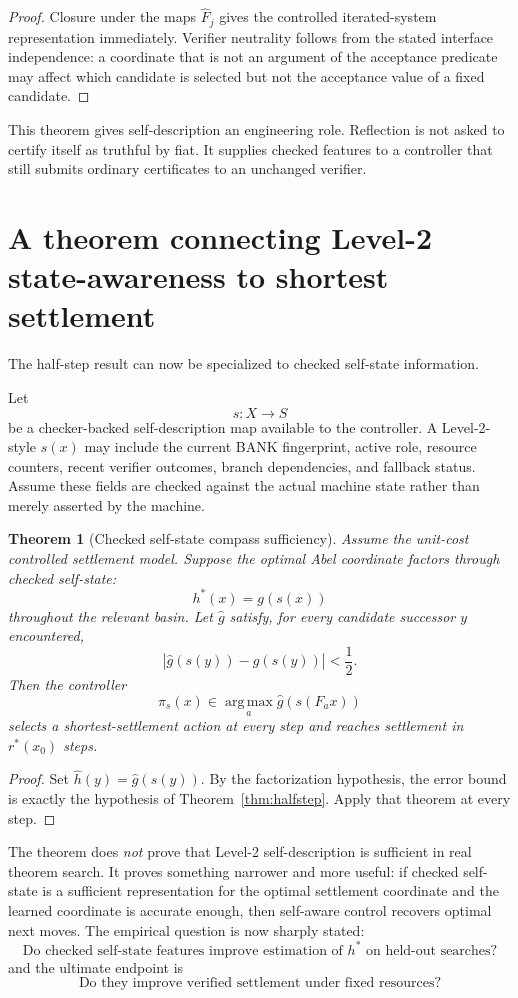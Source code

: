 \documentclass[11pt]{article}
\newtheorem{theorem}{Theorem}[section]
\theoremstyle{definition}
\theoremstyle{remark}
\newcommand{\argmaxop}{\operatorname*{arg\,max}}
\begin{document}
\begin{proof}
Closure under the maps $\widehat F_j$ gives the controlled iterated-system representation immediately. Verifier neutrality follows from the stated interface independence: a coordinate that is not an argument of the acceptance predicate may affect which candidate is selected but not the acceptance value of a fixed candidate.
\end{proof}

This theorem gives self-description an engineering role. Reflection is not asked to certify itself as truthful by fiat. It supplies checked features to a controller that still submits ordinary certificates to an unchanged verifier.

\section{A theorem connecting Level-2 state-awareness to shortest settlement}

The half-step result can now be specialized to checked self-state information.

Let
\[
s:X\to S
\]
be a checker-backed self-description map available to the controller. A Level-2-style $s(x)$ may include the current BANK fingerprint, active role, resource counters, recent verifier outcomes, branch dependencies, and fallback status. Assume these fields are checked against the actual machine state rather than merely asserted by the machine.

\begin{theorem}[Checked self-state compass sufficiency]\label{thm:selfcompass}
Assume the unit-cost controlled settlement model. Suppose the optimal Abel coordinate factors through checked self-state:
\[
h^*(x)=g(s(x))
\]
throughout the relevant basin. Let $\widehat g$ satisfy, for every candidate successor $y$ encountered,
\[
|\widehat g(s(y))-g(s(y))|<\frac12.
\]
Then the controller
\[
\pi_s(x)\in\argmaxop_a \widehat g(s(F_a x))
\]
selects a shortest-settlement action at every step and reaches settlement in $r^*(x_0)$ steps.
\end{theorem}

\begin{proof}
Set $\widehat h(y)=\widehat g(s(y))$. By the factorization hypothesis, the error bound is exactly the hypothesis of Theorem~\ref{thm:halfstep}. Apply that theorem at every step.
\end{proof}

The theorem does \emph{not} prove that Level-2 self-description is sufficient in real theorem search. It proves something narrower and more useful: if checked self-state is a sufficient representation for the optimal settlement coordinate and the learned coordinate is accurate enough, then self-aware control recovers optimal next moves. The empirical question is now sharply stated:
\[
\boxed{\text{Do checked self-state features improve estimation of }h^*\text{ on held-out searches?}}
\]
and the ultimate endpoint is
\[
\boxed{\text{Do they improve verified settlement under fixed resources?}}
\]
\end{document}

